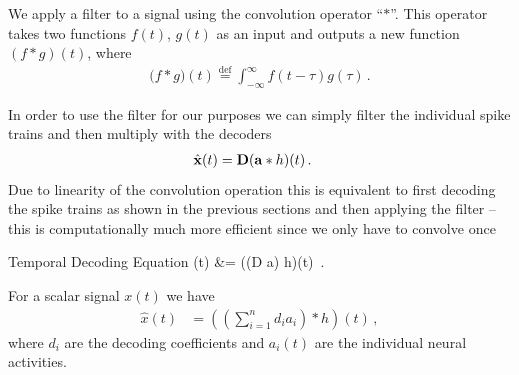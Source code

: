 \documentclass[10pt,letterpaper,oneside]{article}
\begin{document}
We apply a filter to a signal using the convolution operator \enquote{$\ast$}. This operator takes two functions $f(t)$, $g(t)$ as an input and outputs a new function $(f \ast g)(t)$, where
\begin{align*}
	\big( f \ast g \big)(t) \overset{\text{def}}= \int_{-\infty}^{\infty} f(t - \tau) g(\tau) \,.
\end{align*}


In order to use the filter for our purposes we can simply filter the individual spike trains and then multiply with the decoders 
\begin{align*}
	\hat{{\mathbf{x}}}(t) &= {\mathbf{D}} ({\mathbf{a}} \ast h)(t) \,.
\end{align*}
Due to linearity of the convolution operation this is equivalent to first decoding the spike trains as shown in the previous sections and then applying the filter -- this is computationally much more efficient since we only have to convolve once
\begin{ImportantEqn}{Temporal Decoding Equation}
	(t) &= \big((\mat D \vec a) \ast h\big)(t) \,.
	\label{eqn:temporal_decoding_equation}
\end{ImportantEqn}
For a scalar signal $x(t)$ we have
\begin{align*}
	\hat{x}(t) &= \left( \left( \sum_{i = 1}^n d_i a_i \right) \ast h\right)(t) \,,
\end{align*}
where $d_i$ are the decoding coefficients and $a_i(t)$ are the individual neural activities.
\end{document}
